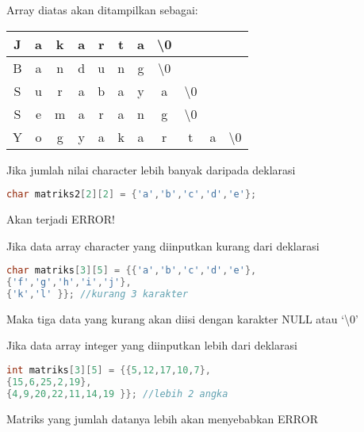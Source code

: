 Array diatas akan ditampilkan sebagai:

\begin{tabular}{|c|c|c|c|c|c|c|c|c|c|c|}
\hline
J & a & k & a & r & t & a & \textbackslash{0} & & & \\ \hline
B & a & n & d & u & n & g & \textbackslash{0} & & & \\ \hline
S & u & r & a & b & a & y & a &\textbackslash{0}  & &\\ \hline
S & e & m & a & r & a & n & g & \textbackslash{0} & & \\ \hline
Y & o & g & y & a & k & a & r & t & a &   \textbackslash{0} \\ \hline

\end{tabular}


Jika jumlah nilai character lebih banyak daripada deklarasi

\begin{lstlisting}[language=c++, numbers=none]
char matriks2[2][2] = {'a','b','c','d','e'};
\end{lstlisting}

{\LARGE {}}  Akan terjadi ERROR!

\begin{figure}[htbp]
\centering
{}

\end{figure}

Jika data array character yang diinputkan kurang dari deklarasi

\begin{lstlisting}[language=c++, numbers=none]
char matriks[3][5] = {{'a','b','c','d','e'},
{'f','g','h','i','j'},
{'k','l' }}; //kurang 3 karakter
\end{lstlisting}

Maka tiga data yang kurang akan diisi dengan karakter NULL atau `\textbackslash{}0'

Jika data array integer yang diinputkan lebih dari deklarasi

\begin{lstlisting}[language=c++, numbers=none]
int matriks[3][5] = {{5,12,17,10,7},
{15,6,25,2,19},
{4,9,20,22,11,14,19 }}; //lebih 2 angka
\end{lstlisting}

{\LARGE {}} Matriks yang jumlah datanya lebih akan menyebabkan ERROR


\begin{figure}
\centering
{}
\end{figure}




